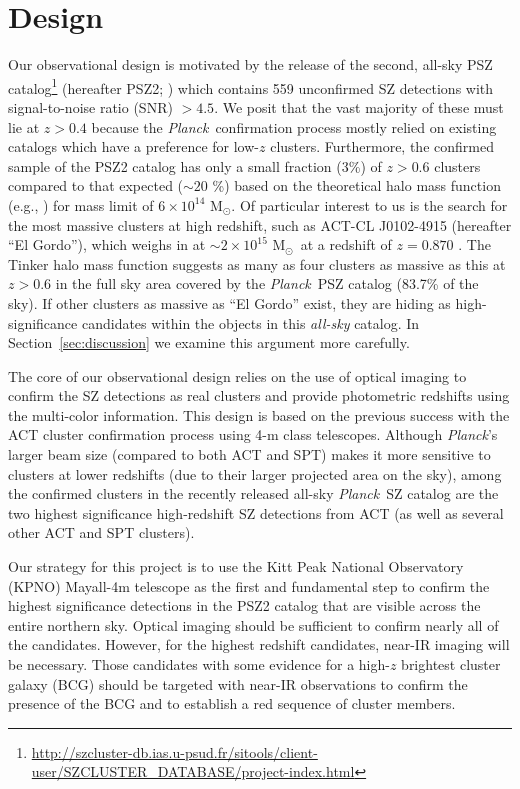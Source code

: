 \documentclass[apj, revtex4-1]{emulateapj}
\newcommand{\planck}{\textit{Planck}}
\newcommand{\msol}{\hbox{$\mathrm{M}_\odot$}}
\newcommand{\eg}{e.g.}
\newcommand{\citeeg}[1]{(\eg, \citealt{#1})}
\begin{document}
\section{Design}\label{sec:design}
Our observational design is motivated by the release of the second, all-sky PSZ catalog\footnote{\url{http://szcluster-db.ias.u-psud.fr/sitools/client-user/SZCLUSTER_DATABASE/project-index.html}} (hereafter PSZ2; \citealt{PlanckCollaboration2015a}) which contains 559 unconfirmed SZ detections with signal-to-noise ratio (SNR) $> 4.5$. We posit that the vast majority of these must lie at $z>0.4$ because the \planck\ confirmation process \citep{PlanckCollaboration2014} mostly relied on existing catalogs which have a preference for low-$z$ clusters. Furthermore, the confirmed sample of the PSZ2 catalog has only a small fraction (3\%) of $z > 0.6$ clusters compared to that expected ($\sim20$
\%) based on the theoretical halo mass function \citeeg{Jenkins2001, Tinker2008} for mass limit of $6\times10^{14}$ \msol. Of particular interest to us is the search for the most massive clusters at high redshift, such as ACT-CL J0102-4915 (hereafter ``El Gordo''), which weighs in at $\sim2 \times 10^{15}$ \msol\ at a redshift of $z=0.870$ \citep{Menanteau2012}. The Tinker halo mass function suggests as many as four clusters as massive as this at $z>0.6$ in the full sky area covered by the \planck\ PSZ catalog (83.7\% of the sky). If other clusters as massive as ``El Gordo'' exist, they are hiding as high-significance candidates within the objects in this \textit{all-sky} catalog. In Section~\ref{sec:discussion} we examine this argument more carefully.

The core of our observational design relies on the use of optical imaging to confirm the SZ detections as real clusters and provide photometric redshifts using the multi-color information. This design is based on the previous success with the ACT cluster confirmation process using 4-m class telescopes. Although \planck’s larger beam size (compared to both ACT and SPT) makes it more sensitive to clusters at lower redshifts (due to their larger projected area on the sky), among the confirmed clusters in the recently released all-sky \planck\ SZ catalog are the two highest significance high-redshift SZ detections from ACT (as well as several other ACT and SPT clusters).

Our strategy for this project is to use the Kitt Peak National Observatory (KPNO) Mayall-4m telescope as the first and fundamental step to confirm the highest significance detections in the PSZ2 catalog that are visible across the entire northern sky. Optical imaging should be sufficient to confirm nearly all of the candidates. However, for the highest redshift candidates, near-IR imaging will be necessary. Those candidates with some evidence for a high-$z$ brightest cluster galaxy (BCG) should be targeted with near-IR observations to confirm the presence of the BCG and to establish a red sequence of cluster members.
\end{document}
